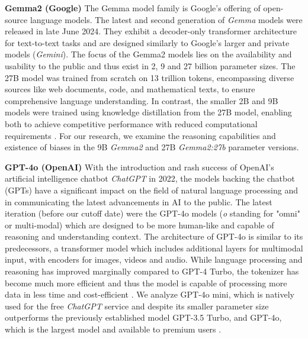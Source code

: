 \par \textbf{Gemma2 (Google)} The Gemma model family is Google's offering of open-source language models. The latest and second generation of \textit{Gemma} models were released in late June 2024. They exhibit a decoder-only transformer architecture for text-to-text tasks and are designed similarly to Google's larger and private models (\textit{Gemini}). The focus of the Gemma2 models lies on the availability and usability to the public and thus exist in 2, 9 and 27 billion parameter sizes. The 27B model was trained from scratch on 13 trillion tokens, encompassing diverse sources like web documents, code, and mathematical texts, to ensure comprehensive language understanding. In contrast, the smaller 2B and 9B models were trained using knowledge distillation from the 27B model, enabling both to achieve competitive performance with reduced computational requirements \parencite{team2024gemma}. For our research, we examine the reasoning capabilities and existence of biases in the 9B \textit{Gemma2} and 27B \textit{Gemma2:27b} parameter versions.

\par \textbf{GPT-4o (OpenAI)} With the introduction and rash success of OpenAI's artificial intelligence chatbot \textit{ChatGPT} in 2022, the models backing the chatbot (GPTs) have a significant impact on the field of natural language processing and in communicating the latest advancements in AI to the public. The latest iteration (before our cutoff date) were the GPT-4o models (\textit{o} standing for "omni" or multi-modal) which are designed to be more human-like and capable of reasoning and understanding context. The architecture of GPT-4o is similar to its predecessors, a transformer model which includes additional layers for multimodal input, with encoders for images, videos and audio. While language processing and reasoning has improved marginally compared to GPT-4 Turbo, the tokenizer has become much more efficient and thus the model is capable of processing more data in less time and cost-efficient \parencite{achiam2023gpt, openai2024gpt4o}. We analyze GPT-4o mini, which is natively used for the free \textit{ChatGPT} service and despite its smaller parameter size outperforms the previously established model GPT-3.5 Turbo, and GPT-4o, which is the largest model and available to premium users \parencite{openai2024gpt4omini}.

